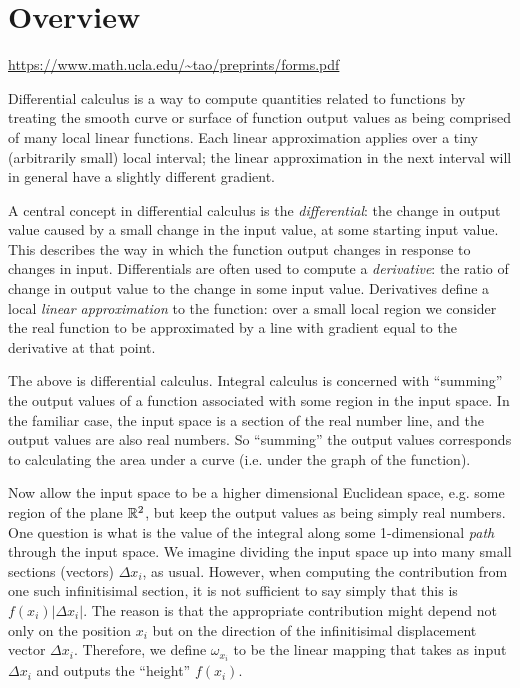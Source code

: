 \section{Overview}

\url{https://www.math.ucla.edu/~tao/preprints/forms.pdf}

Differential calculus is a way to compute quantities related to functions by treating the smooth
curve or surface of function output values as being comprised of many local linear functions. Each
linear approximation applies over a tiny (arbitrarily small) local interval; the linear
approximation in the next interval will in general have a slightly different gradient.

A central concept in differential calculus is the \textit{differential}: the change in output value
caused by a small change in the input value, at some starting input value. This describes the way in
which the function output changes in response to changes in input. Differentials are often used to
compute a \textit{derivative}: the ratio of change in output value to the change in some input
value. Derivatives define a local \textit{linear approximation} to the function: over a small local
region we consider the real function to be approximated by a line with gradient equal to the
derivative at that point.

The above is differential calculus. Integral calculus is concerned with ``summing'' the output values
of a function associated with some region in the input space. In the familiar case, the input space
is a section of the real number line, and the output values are also real numbers. So ``summing'' the
output values corresponds to calculating the area under a curve (i.e. under the graph of the
function).

Now allow the input space to be a higher dimensional Euclidean space, e.g. some region of the plane
$\mathbb{R}^2$, but keep the output values as being simply real numbers. One question is what is the value
of the integral along some 1-dimensional \textit{path} through the input space. We imagine dividing
the input space up into many small sections (vectors) $\Delta x_i$, as usual. However, when computing
the contribution from one such infinitisimal section, it is not sufficient to say simply that this
is $f(x_i)|\Delta x_i|$. The reason is that the appropriate contribution might depend not only on the
position $x_i$ but on the direction of the infinitisimal displacement vector
$\Delta x_i$. Therefore, we define $\omega_{x_i}$ to be the linear mapping that takes as input
$\Delta x_i$ and outputs the ``height'' $f(x_i)$.

